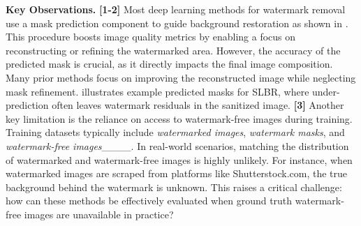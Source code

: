 \textbf{Key Observations.} \textbf{[1-2]} Most deep learning methods for watermark removal use a mask prediction component to guide background restoration as shown in . This procedure boosts image quality metrics by enabling a focus on reconstructing or refining the watermarked area. However, the accuracy of the predicted mask is crucial, as it directly impacts the final image composition. Many prior methods focus on improving the reconstructed image while neglecting mask refinement.  illustrates example predicted masks for SLBR, where under-prediction often leaves watermark residuals in the sanitized image. \textbf{[3]} Another key limitation is the reliance on access to watermark-free images during training. Training datasets typically include \textit{watermarked images}, \textit{watermark masks}, and \textit{watermark-free images}____. In real-world scenarios, matching the distribution of watermarked and watermark-free images is highly unlikely. For instance, when watermarked images are scraped from platforms like Shutterstock.com, the true background behind the watermark is unknown. This raises a critical challenge: how can these methods be effectively evaluated when ground truth watermark-free images are unavailable in practice?





